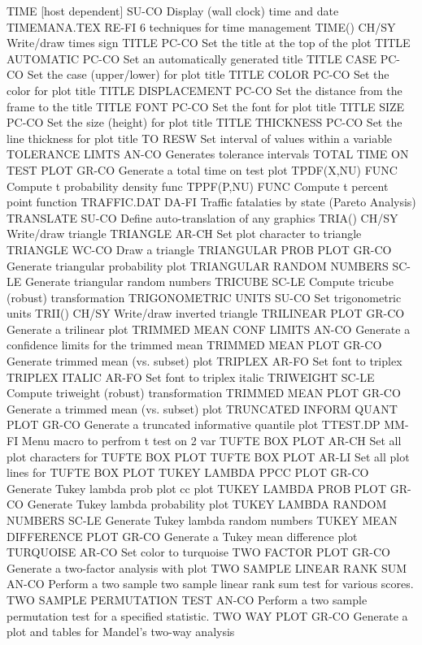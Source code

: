 TIME  [host dependent]      SU-CO Display (wall clock) time and date
TIMEMANA.TEX                RE-FI 6 techniques for time management
TIME()                      CH/SY Write/draw times sign
TITLE                       PC-CO Set the title at the top of the plot
TITLE AUTOMATIC             PC-CO Set an automatically generated title
TITLE CASE                  PC-CO Set the case (upper/lower) for plot title
TITLE COLOR                 PC-CO Set the color for plot title
TITLE DISPLACEMENT          PC-CO Set the distance from the frame to the title
TITLE FONT                  PC-CO Set the font for plot title
TITLE SIZE                  PC-CO Set the size (height) for plot title
TITLE THICKNESS             PC-CO Set the line thickness for plot title
TO                          RESW  Set interval of values within a variable
TOLERANCE LIMTS             AN-CO Generates tolerance intervals
TOTAL TIME ON TEST PLOT     GR-CO Generate a total time on test plot
TPDF(X,NU)                  FUNC  Compute t probability density func
TPPF(P,NU)                  FUNC  Compute t percent point function
TRAFFIC.DAT                 DA-FI Traffic fatalaties by state (Pareto Analysis)
TRANSLATE                   SU-CO Define auto-translation of any graphics
TRIA()                      CH/SY Write/draw triangle
TRIANGLE                    AR-CH Set plot character to triangle
TRIANGLE                    WC-CO Draw a triangle
TRIANGULAR PROB PLOT        GR-CO Generate triangular probability plot
TRIANGULAR RANDOM NUMBERS   SC-LE Generate triangular random numbers
TRICUBE                     SC-LE Compute tricube (robust) transformation
TRIGONOMETRIC UNITS         SU-CO Set trigonometric units
TRII()                      CH/SY Write/draw inverted triangle
TRILINEAR PLOT              GR-CO Generate a trilinear plot
TRIMMED MEAN CONF LIMITS    AN-CO Generate a confidence limits for the trimmed mean
TRIMMED MEAN PLOT           GR-CO Generate trimmed mean (vs. subset) plot
TRIPLEX                     AR-FO Set font to triplex
TRIPLEX ITALIC              AR-FO Set font to triplex italic
TRIWEIGHT                   SC-LE Compute triweight (robust) transformation
TRIMMED MEAN PLOT           GR-CO Generate a trimmed mean (vs. subset) plot
TRUNCATED INFORM QUANT PLOT GR-CO Generate a truncated informative quantile plot
TTEST.DP                    MM-FI Menu macro to perfrom t test on 2 var
TUFTE BOX PLOT              AR-CH Set all plot characters for TUFTE BOX PLOT
TUFTE BOX PLOT              AR-LI Set all plot lines for TUFTE BOX PLOT
TUKEY LAMBDA PPCC PLOT      GR-CO Generate Tukey lambda prob plot cc plot
TUKEY LAMBDA PROB PLOT      GR-CO Generate Tukey lambda probability plot
TUKEY LAMBDA RANDOM NUMBERS SC-LE Generate Tukey lambda random numbers
TUKEY MEAN DIFFERENCE PLOT  GR-CO Generate a Tukey mean difference plot
TURQUOISE                   AR-CO Set color to turquoise
TWO FACTOR PLOT             GR-CO Generate a two-factor analysis with plot
TWO SAMPLE LINEAR RANK SUM  AN-CO Perform a two sample two sample linear rank sum test for various scores.
TWO SAMPLE PERMUTATION TEST AN-CO Perform a two sample permutation test for a specified statistic.
TWO WAY PLOT                GR-CO Generate a plot and tables for Mandel's two-way analysis

